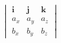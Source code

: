 \documentclass[preview]{standalone}
\begin{document}
\begin{align*}
\begin{vmatrix}
        \mathbf{i} & \mathbf{j} & \mathbf{k} \\
        a_x & a_y & a_z \\
        b_x & b_y & b_z
        \end{vmatrix}
\end{align*}
\end{document}
